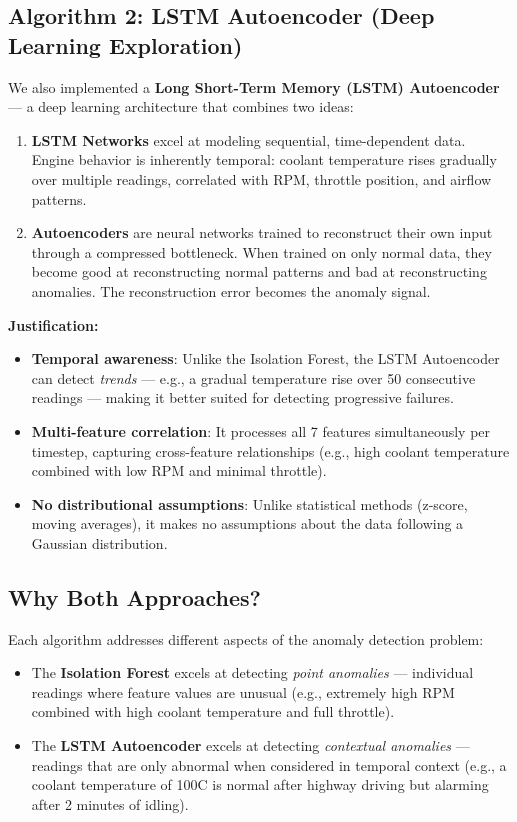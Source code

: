 \subsection{Algorithm 2: LSTM Autoencoder (Deep Learning Exploration)}

We also implemented a \textbf{Long Short-Term Memory (LSTM) Autoencoder} --- a deep learning architecture that combines two ideas:

\begin{enumerate}
    \item \textbf{LSTM Networks} excel at modeling sequential, time-dependent data. Engine behavior is inherently temporal: coolant temperature rises gradually over multiple readings, correlated with RPM, throttle position, and airflow patterns.

    \item \textbf{Autoencoders} are neural networks trained to reconstruct their own input through a compressed bottleneck. When trained on only normal data, they become good at reconstructing normal patterns and bad at reconstructing anomalies. The reconstruction error becomes the anomaly signal.
\end{enumerate}

\textbf{Justification:}
\begin{itemize}
    \item \textbf{Temporal awareness}: Unlike the Isolation Forest, the LSTM Autoencoder can detect \textit{trends} --- e.g., a gradual temperature rise over 50 consecutive readings --- making it better suited for detecting progressive failures.
    \item \textbf{Multi-feature correlation}: It processes all 7 features simultaneously per timestep, capturing cross-feature relationships (e.g., high coolant temperature combined with low RPM and minimal throttle).
    \item \textbf{No distributional assumptions}: Unlike statistical methods (z-score, moving averages), it makes no assumptions about the data following a Gaussian distribution.
\end{itemize}

\subsection{Why Both Approaches?}

Each algorithm addresses different aspects of the anomaly detection problem:

\begin{itemize}
    \item The \textbf{Isolation Forest} excels at detecting \textit{point anomalies} --- individual readings where feature values are unusual (e.g., extremely high RPM combined with high coolant temperature and full throttle).
    \item The \textbf{LSTM Autoencoder} excels at detecting \textit{contextual anomalies} --- readings that are only abnormal when considered in temporal context (e.g., a coolant temperature of 100\textdegree C is normal after highway driving but alarming after 2 minutes of idling).
\end{itemize}

